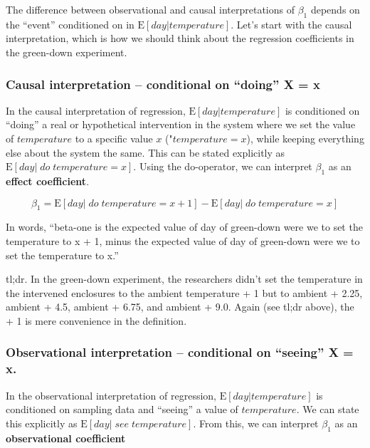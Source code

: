 \documentclass[]{book}
\begin{document}
The difference between observational and causal interpretations of \(\beta_1\) depends on the ``event'' conditioned on in \(\textrm{E}[day|temperature]\). Let's start with the causal interpretation, which is how we should think about the regression coefficients in the green-down experiment.

\hypertarget{causal-interpretation-conditional-on-doing-x-x}{%
\subsubsection{Causal interpretation -- conditional on ``doing'' X = x}\label{causal-interpretation-conditional-on-doing-x-x}}

In the causal interpretation of regression, \(\textrm{E}[day|temperature]\) is conditioned on ``doing'' a real or hypothetical intervention in the system where we set the value of \(temperature\) to a specific value \(x\) ("\(temperature=x\)), while keeping everything else about the system the same. This can be stated explicitly as \(\textrm{E}[day|\;do\;temperature = x]\). Using the do-operator, we can interpret \(\beta_1\) as an \textbf{effect coefficient}.

\begin{equation}
\beta_1 = \textrm{E}[day|\;do\;temperature = x+1] - \textrm{E}[day|\;do\;temperature = x]
\end{equation}

In words, ``beta-one is the expected value of day of green-down were we to set the temperature to x + 1, minus the expected value of day of green-down were we to set the temperature to x.''

tl;dr. In the green-down experiment, the researchers didn't set the temperature in the intervened enclosures to the ambient temperature + 1 but to ambient + 2.25, ambient + 4.5, ambient + 6.75, and ambient + 9.0. Again (see tl;dr above), the + 1 is mere convenience in the definition.

\hypertarget{observational-interpretation-conditional-on-seeing-x-x.}{%
\subsubsection{Observational interpretation -- conditional on ``seeing'' X = x.}\label{observational-interpretation-conditional-on-seeing-x-x.}}

In the observational interpretation of regression, \(\textrm{E}[day|temperature]\) is conditioned on sampling data and ``seeing'' a value of \(temperature\). We can state this explicitly as \(\textrm{E}[day|\;see\;temperature]\). From this, we can interpret \(\beta_1\) as an \textbf{observational coefficient}
\end{document}

